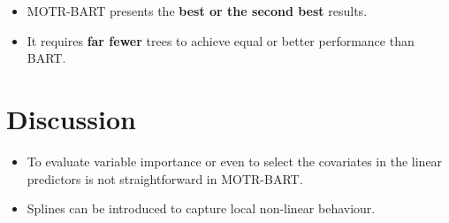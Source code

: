 \documentclass[
    ,title     = {{Bayesian Additive Regression Trees with Model Trees}}
    ,author    = {{Estevao B. Prado}}
    ,subject   = {{This is the subject of my work}}
   ,toplogo   = {{header_poster}}
,longtitle
]{dtuposter}
\begin{document}
\begin{dtupostercontent}
\begin{itemize}
    \item MOTR-BART presents the \textbf{best or the second best} results.
    \item It requires \textbf{far fewer} trees to achieve equal or better performance than BART.
\end{itemize}


\section{Discussion}

\begin{itemize}
    \item To evaluate variable importance or even to select the covariates in the linear predictors is not straightforward in MOTR-BART.
    \item Splines can be introduced to capture local non-linear behaviour.
\end{itemize}

\printbibliography

\end{dtupostercontent}
\end{document}
